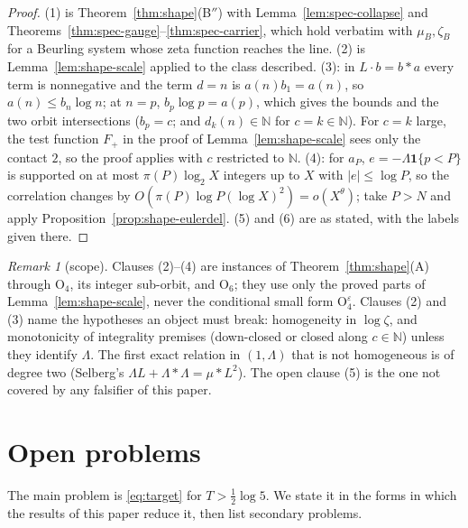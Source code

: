 \documentclass[11pt]{amsart}
\theoremstyle{definition}
\theoremstyle{remark}
\newtheorem{remark}[theorem]{Remark}
\newcommand{\N}{\mathbb N}
\begin{document}
\begin{proof}
(1) is Theorem~\ref{thm:shape}(B$''$) with Lemma~\ref{lem:spec-collapse} and Theorems~\ref{thm:spec-gauge}--\ref{thm:spec-carrier}, which
hold verbatim with $\mu_B,\zeta_B$ for a Beurling system whose zeta function reaches the line. (2) is Lemma~\ref{lem:shape-scale} applied
to the class described. (3): in $L\cdot b=b*a$ every term is nonnegative and the term $d=n$ is $a(n)b_1=a(n)$, so $a(n)\le b_n\log n$;
at $n=p$, $b_p\log p=a(p)$, which gives the bounds and the two orbit intersections ($b_p=c$; and $d_k(n)\in\N$ for $c=k\in\N$). For
$c=k$ large, the test function $F_+$ in the proof of Lemma~\ref{lem:shape-scale} sees only the contact $2$, so the proof applies with
$c$ restricted to $\N$. (4): for $a_P$, $e=-\Lambda\mathbf 1\{p<P\}$ is supported on at most $\pi(P)\log_2X$ integers up to $X$ with
$|e|\le\log P$, so the correlation changes by $O(\pi(P)\log P(\log X)^2)=o(X^\theta)$; take $P>N$ and apply
Proposition~\ref{prop:shape-eulerdel}. (5) and (6) are as stated, with the labels given there.
\end{proof}

\begin{remark}[scope]\label{rem:spec-scope}
Clauses (2)--(4) are instances of Theorem~\ref{thm:shape}(A) through $\mathrm O_4$, its integer sub-orbit, and $\mathrm O_6$; they use only
the proved parts of Lemma~\ref{lem:shape-scale}, never the conditional small form $\mathrm O_4^\varepsilon$. Clauses (2) and (3) name
the hypotheses an object must break: homogeneity in $\log\zeta$, and monotonicity of integrality premises (down-closed or closed along
$c\in\N$) unless they identify $\Lambda$. The first exact relation in $(1,\Lambda)$ that is not homogeneous is of degree two (Selberg's
$\Lambda L+\Lambda*\Lambda=\mu*L^2$). The open clause (5) is the one not covered by any falsifier of this paper.
\end{remark}

\section{Open problems}\label{sec:open}

The main problem is \eqref{eq:target} for $T>\frac12\log5$. We state it in the forms in which the results of
this paper reduce it, then list secondary problems.
\end{document}
